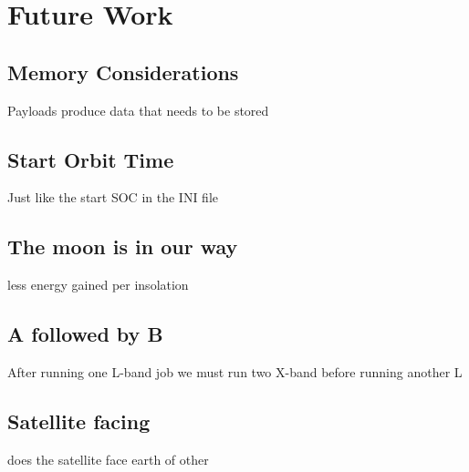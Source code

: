 \section{Future Work} \label{sec:future}

\subsection{Memory Considerations}
Payloads produce data that needs to be stored

\subsection{Start Orbit Time}
Just like the start SOC in the INI file

\subsection{The moon is in our way}
less energy gained per insolation

\subsection{A followed by B}
After running one L-band job we must run two X-band before running another L

\subsection{Satellite facing}
does the satellite face earth of other